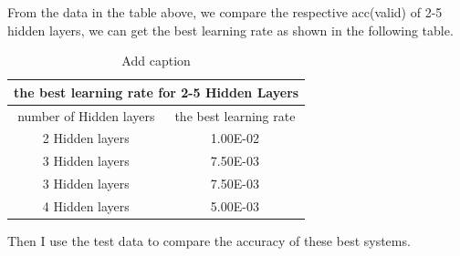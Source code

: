 \documentclass{article}
\begin{document}
From the data in the table above, we compare the respective acc(valid) of  2-5 hidden layers, we can get the best learning rate as shown in the following table.

\begin{table}[htbp]
  \centering
  \caption{Add caption}
    \begin{tabular}{|c|c|}
    \toprule
    \multicolumn{2}{|p{23.92em}}{the best learning rate for 2-5 Hidden Layers} \\
    \midrule
    \multicolumn{1}{|c|}{\multirow{2}[2]{*}{number of Hidden layers}} & \multicolumn{1}{c|}{\multirow{2}[2]{*}{the best learning rate}} \\
          &  \\
    \midrule
    \multicolumn{1}{|c|}{\multirow{2}[2]{*}{2 Hidden layers}} & \multirow{2}[2]{*}{1.00E-02} \\
          &  \\
    \midrule
    \multicolumn{1}{|c|}{\multirow{2}[2]{*}{3 Hidden layers}} & \multirow{2}[2]{*}{7.50E-03} \\
          &  \\
    \midrule
    \multicolumn{1}{|c|}{\multirow{2}[2]{*}{3 Hidden layers}} & \multirow{2}[2]{*}{7.50E-03} \\
          &  \\
    \midrule
    \multicolumn{1}{|c|}{\multirow{2}[2]{*}{4 Hidden layers}} & \multirow{2}[2]{*}{5.00E-03} \\
          &  \\
    \bottomrule
    \end{tabular}%
  \label{tab:addlabel}%
\end{table}%


Then I use the test data to compare the accuracy of these best systems.
\end{document}
